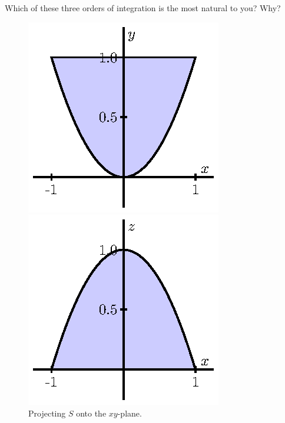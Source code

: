 \begin{activity}
	\item Which of these three orders of integration is the most natural to you?  Why?

	\ea

\begin{figure}[ht]
\begin{center}
\begin{minipage}{1.75in}
\begin{center}
  \includegraphics{figures/fig_11_7_solid_proj_1.eps}
\end{center}
\caption{Projecting $S$ onto the $xy$-plane.}
\label{F:11.7.TI_Example_2_xy}
\end{minipage} \hspace{0.1in}
\begin{minipage}{1.75in}
\begin{center}
  \includegraphics{figures/fig_11_7_solid_proj_2.eps}

\end{center}
\end{minipage}
\end{center}
\end{figure}
\end{activity}
